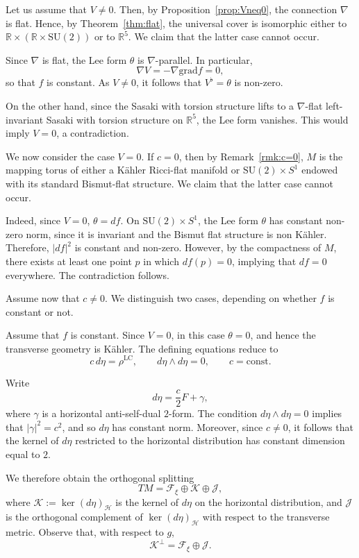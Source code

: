 \documentclass{article}
\makeatletter
\renewenvironment{proof}[1][\proofname]{%
  \par\pushQED{\qed}%
  \normalfont\topsep6\p@\@plus6\p@\relax
  \trivlist
  \item[\hskip\labelsep
        \textbf{\textup{#1}}\@addpunct{.}]\ignorespaces
}{%
  \popQED\endtrivlist\@endpefalse
}
\theoremstyle{definition}
\newcommand{\R}{\mathbb{R}}
\numberwithin{equation}{section}
\makeatother
\begin{document}
\begin{proof}
Let us assume that $V \neq 0$. Then, by Proposition~\ref{prop:Vneq0}, the connection $\nabla$ is flat. Hence, by Theorem~\ref{thm:flat}, the universal cover is isomorphic either to $\mathbb{R} \times (\mathbb{R} \times \mathrm{SU}(2))$ or to $\mathbb{R}^5$. We claim that the latter case cannot occur.  \par

Since $\nabla$ is flat, the Lee form $\theta$ is $\nabla$-parallel. In particular,
\[
\nabla V = -\nabla \mathrm{grad} f = 0,
\]
so that $f$ is constant. As $V \neq 0$, it follows that $V^\flat = \theta$ is non-zero.

On the other hand, since the Sasaki with torsion structure lifts to a $\nabla$-flat left-invariant Sasaki with torsion structure on $\R^5$, the Lee form vanishes. This would imply $V = 0$, a contradiction.  \medskip

We now consider the case $V = 0$. If $c = 0$, then by Remark~\ref{rmk:c=0}, $M$ is the mapping torus of either a K\"ahler Ricci-flat manifold or $\mathrm{SU}(2) \times S^1$ endowed with its standard Bismut-flat structure. We claim that the latter case cannot occur.

Indeed, since $V=0$, $\theta = df$. On $\mathrm{SU}(2) \times S^1$, the Lee form $\theta$ has constant non-zero norm, since it is invariant and the Bismut flat structure is non K\"ahler. Therefore, $|df|^2$ is constant and non-zero. 
However, by the compactness of $M$, there exists at least one point $p$ in which $df(p)=0$, implying that $df=0$ everywhere. The contradiction follows. 
\medskip

Assume now that $c \neq 0$. We distinguish two cases, depending on whether $f$ is constant or not.

\smallskip

\noindent
Assume that $f$ is constant. Since $V=0$, in this case $\theta = 0$, and hence the transverse geometry is K\"ahler. The defining equations reduce to
\[
c\, d\eta = \rho^{\mathrm{LC}}, \qquad d\eta \wedge d\eta = 0, \qquad c = \mathrm{const}.
\]

Write
\[
d\eta = \frac{c}{2} F + \gamma,
\]
where $\gamma$ is a horizontal anti-self-dual $2$-form. The condition $d\eta \wedge d\eta = 0$ implies that $|\gamma|^2 = c^2$, and so $d\eta$ has constant norm. Moreover, since $c \neq 0$, it follows that the kernel of $d\eta$ restricted to the horizontal distribution has constant dimension equal to $2$.

We therefore obtain the orthogonal splitting
\[
TM = \mathcal{F}_\xi \oplus \mathcal{K} \oplus \mathcal{J},
\]
where $\mathcal{K} := \ker(d\eta)_{\mathcal{H}}$ is the kernel of $d\eta$ on the horizontal distribution, and $\mathcal{J}$ is the orthogonal complement of $\ker(d\eta)_{\mathcal{H}}$ with respect to the transverse metric. Observe that, with respect to $g$,
\[
\mathcal{K}^\perp = \mathcal{F}_\xi \oplus \mathcal{J}.
\]


\end{proof}
\end{document}
